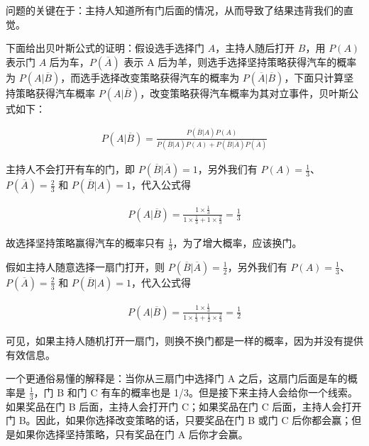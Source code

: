 问题的关键在于：主持人知道所有门后面的情况，从而导致了结果违背我们的直觉。

下面给出贝叶斯公式的证明：假设选手选择门 $A$，主持人随后打开 $B$，用 $P(A)$ 表示门 $A$ 后为车，$P(\overline{A})$ 表示 A 后为羊，则选手选择坚持策略获得汽车的概率为 $P(A|\overline{B})$，而选手选择改变策略获得汽车的概率为 $P(\overline{A}|\overline{B})$，下面只计算坚持策略获得汽车概率 $P(A|\overline{B})$，改变策略获得汽车概率为其对立事件，贝叶斯公式如下：

\begin{align*}
P(A|\overline{B})=\frac{P(\overline{B}|A)P(A)}{P(\overline{B}|A)P(A)+P(\overline{B}|\overline{A})P(\overline{A})}
\end{align*}

主持人不会打开有车的门，即 $P(\overline{B}|\overline{A})=1$，另外我们有 $P(A)=\frac{1}{3}$、$P(\overline{A})=\frac{2}{3}$ 和 $P(\overline{B}|A)=1$，代入公式得

\begin{align*}
P(A|\overline{B})=\frac{1\times\frac{1}{3}}{1\times\frac{1}{3}+1\times\frac{2}{3}}=\frac{1}{3}
\end{align*}

故选择坚持策略赢得汽车的概率只有 $\frac{1}{3}$，为了增大概率，应该换门。

假如主持人随意选择一扇门打开，则 $P(\overline{B}|\overline{A})=\frac{1}{2}$，另外我们有 $P(A)=\frac{1}{3}$、$P(\overline{A})=\frac{2}{3}$ 和 $P(\overline{B}|A)=1$，代入公式得

\begin{align*}
P(A|\overline{B})=\frac{1\times\frac{1}{3}}{1\times\frac{1}{3}+\frac{1}{2}\times\frac{2}{3}}=\frac{1}{2}
\end{align*}

可见，如果主持人随机打开一扇门，则换不换门都是一样的概率，因为并没有提供有效信息。

一个更通俗易懂的解释是：当你从三扇门中选择门 A 之后，这扇门后面是车的概率是 $\frac{1}{3}$，门 B 和门 C 有车的概率也是 1/3。但是接下来主持人会给你一个线索。如果奖品在门 B 后面，主持人会打开门 C；如果奖品在门 C 后面，主持人会打开门 B。因此，如果你选择改变策略的话，只要奖品在门 B 或门 C 后你都会赢；但是如果你选择坚持策略，只有奖品在门 A 后你才会赢。

